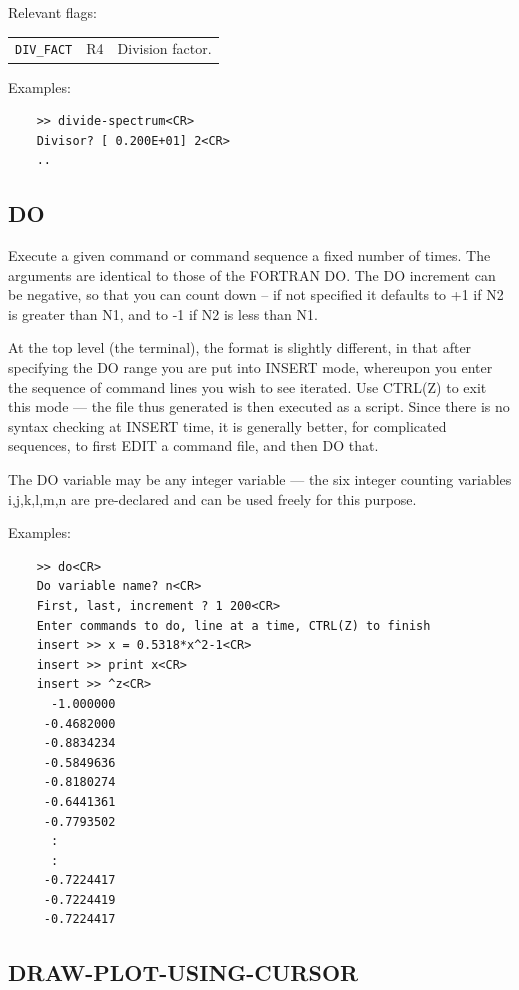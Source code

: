 \documentclass[11pt,twoside]{report}
\begin{document}
Relevant flags:\\
\begin{tabular}{lll}
  \verb+DIV_FACT+ & R4 & Division factor.
\end{tabular}

Examples:
\begin{verbatim}
    >> divide-spectrum<CR>
    Divisor? [ 0.200E+01] 2<CR>
    ..
\end{verbatim}

\subsection{DO}  

Execute a given command or command sequence a fixed number of times.
The arguments are identical to those of the FORTRAN DO. The DO increment
can be negative, so that you can count down -- if not specified it defaults
to +1 if N2 is greater than N1, and to -1 if N2 is less than N1.

At the top level (\ie the terminal), the format is slightly different, in
that after specifying the DO range you are put into INSERT mode, whereupon
you enter the sequence of command lines you wish to see iterated. Use 
CTRL(Z) to exit this mode --- the file thus generated is then executed as
a script.
Since there is no syntax checking at INSERT time,
it is generally better, for complicated sequences, to first EDIT a command
file, and then DO that.

The DO variable may be any integer variable --- the six integer counting
variables i,j,k,l,m,n are pre-declared and can be used freely for this purpose.

Examples:
\begin{verbatim}
    >> do<CR>
    Do variable name? n<CR>
    First, last, increment ? 1 200<CR>
    Enter commands to do, line at a time, CTRL(Z) to finish
    insert >> x = 0.5318*x^2-1<CR>
    insert >> print x<CR>
    insert >> ^z<CR>
      -1.000000
     -0.4682000
     -0.8834234
     -0.5849636
     -0.8180274
     -0.6441361
     -0.7793502
      :
      :
     -0.7224417
     -0.7224419
     -0.7224417
\end{verbatim}

\subsection{DRAW-PLOT-USING-CURSOR} 
\end{document}
